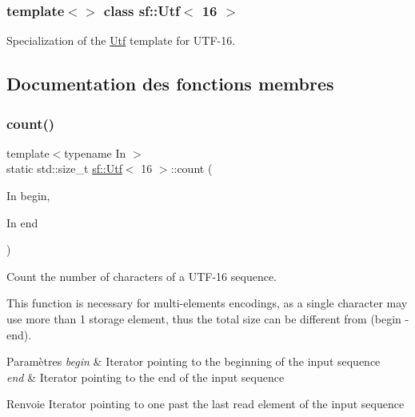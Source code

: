 \subsubsection*{template$<$$>$\newline
class sf\+::\+Utf$<$ 16 $>$}

Specialization of the \hyperlink{classsf_1_1Utf}{Utf} template for U\+T\+F-\/16. 

\subsection{Documentation des fonctions membres}
\mbox{\label{classsf_1_1Utf_3_0116_01_4_a6df8d9be8211ffe1095b3b82eac83f6f}} 
\subsubsection{\texorpdfstring{count()}{count()}}
{\footnotesize\ttfamily template$<$typename In $>$ \\
static std\+::size\+\_\+t \hyperlink{classsf_1_1Utf}{sf\+::\+Utf}$<$ 16 $>$\+::count (\begin{DoxyParamCaption}\item[{In}]{begin,  }\item[{In}]{end }\end{DoxyParamCaption})\hspace{0.3cm}{\ttfamily [static]}}



Count the number of characters of a U\+T\+F-\/16 sequence. 

This function is necessary for multi-\/elements encodings, as a single character may use more than 1 storage element, thus the total size can be different from (begin -\/ end).


\begin{DoxyParams}{Paramètres}
{\em begin} & Iterator pointing to the beginning of the input sequence \\
\hline
{\em end} & Iterator pointing to the end of the input sequence\\
\hline
\end{DoxyParams}
\begin{DoxyReturn}{Renvoie}
Iterator pointing to one past the last read element of the input sequence 
\end{DoxyReturn}
\mbox{\label{classsf_1_1Utf_3_0116_01_4_a17be6fc08e51182e7ac8bf9269dfae37}} 
